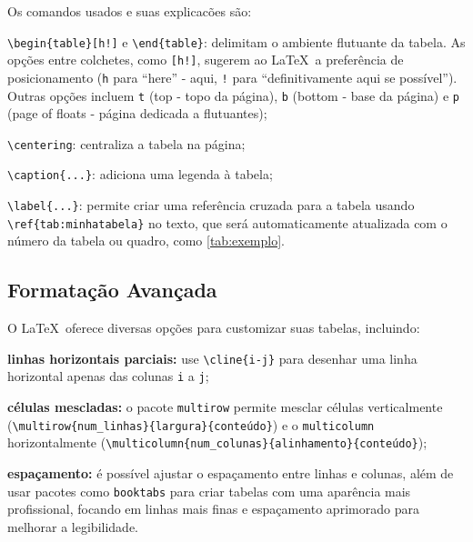 Os comandos usados e suas explicacões são:
\begin{alineas}
	\item \texttt{\textbackslash begin\{table\}[h!]} e \texttt{\textbackslash end\{table\}}: delimitam o ambiente flutuante da tabela. As opções entre colchetes, como \texttt{[h!]}, sugerem ao \LaTeX\  a preferência de posicionamento (\texttt{h} para ``here'' - aqui, \texttt{!} para ``definitivamente aqui se possível''). Outras opções incluem \texttt{t} (top - topo da página), \texttt{b} (bottom - base da página) e \texttt{p} (page of floats - página dedicada a flutuantes);
	\item \texttt{\textbackslash centering}: centraliza a tabela na página;
	\item \texttt{\textbackslash caption\{...\}}: adiciona uma legenda à tabela;
	\item \texttt{\textbackslash label\{...\}}: permite criar uma referência cruzada para a tabela usando\\ \texttt{\textbackslash ref\{tab:minhatabela\}} no texto, que será automaticamente atualizada com o número da tabela ou quadro, como \autoref{tab:exemplo}.
\end{alineas}

\subsection{Formatação Avançada}

O \LaTeX\  oferece diversas opções para customizar suas tabelas, incluindo:

\begin{alineas}
	\item \textbf{linhas horizontais parciais:} use \texttt{\textbackslash cline\{i-j\}} para desenhar uma linha horizontal apenas das colunas \texttt{i} a \texttt{j};
	\item \textbf{células mescladas:} o pacote \texttt{multirow} permite mesclar células verticalmente\\ (\texttt{\textbackslash multirow\{num\_linhas\}\{largura\}\{conteúdo\}}) e o \texttt{multicolumn}\\ horizontalmente (\texttt{\textbackslash multicolumn\{num\_colunas\}\{alinhamento\}\{conteúdo\}});
	\item \textbf{espaçamento:} é possível ajustar o espaçamento entre linhas e colunas, além de usar pacotes como \texttt{booktabs} para criar tabelas com uma aparência mais profissional, focando em linhas mais finas e espaçamento aprimorado para melhorar a legibilidade.
\end{alineas}

